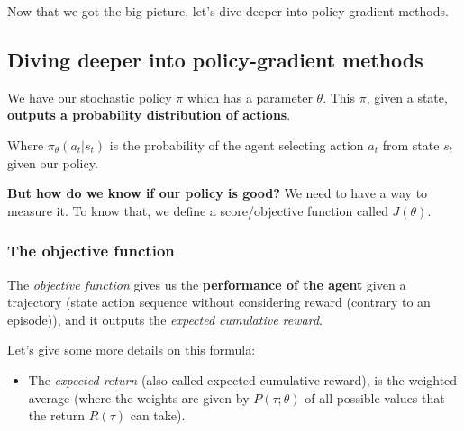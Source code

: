 \documentclass[11pt,a4paper]{article}
\begin{document}
Now that we got the big picture, let's dive deeper into policy-gradient methods.

\subsection{Diving deeper into policy-gradient methods}\label{diving-deeper-into-policy-gradient-methods-1}

We have our stochastic policy \(\pi\) which has a parameter \(\theta\). This \(\pi\), given a state, \textbf{outputs a probability distribution of actions}.


Where \(\pi_\theta(a_t|s_t)\) is the probability of the agent selecting action \(a_t\) from state \(s_t\) given our policy.

\textbf{But how do we know if our policy is good?} We need to have a way to measure it. To know that, we define a score/objective function called \(J(\theta)\).

\subsubsection{The objective function}\label{the-objective-function}

The \emph{objective function} gives us the \textbf{performance of the agent} given a trajectory (state action sequence without considering reward (contrary to an episode)), and it outputs the \emph{expected cumulative reward}.


Let's give some more details on this formula:

\begin{itemize}
\tightlist
\item
  The \emph{expected return} (also called expected cumulative reward), is the weighted average (where the weights are given by \(P(\tau;\theta)\) of all possible values that the return \(R(\tau)\) can take).
\end{itemize}

\end{document}
